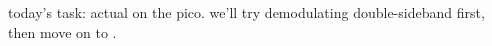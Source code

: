 today's task: actual \dsp on the pico. we'll try demodulating double-sideband
\am first, then move on to \ssb.
